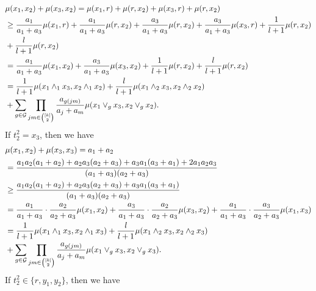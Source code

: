 \documentclass[11pt]{article}
\theoremstyle{definition}
\begin{document}
\begin{align}
    &\mu(x_1,x_2)+\mu(x_3,x_2)=\mu(x_1,r)+\mu(r,x_2)+\mu(x_3,r)+\mu(r,x_2)\notag\\
    &\geq \frac{a_1}{a_1+a_3}\mu(x_1,r)+\frac{a_1}{a_1+a_3}\mu(r,x_2)+\frac{a_3}{a_1+a_3}\mu(r,x_2)+\frac{a_3}{a_1+a_3}\mu(x_3,r)+\frac{1}{l+1}\mu(r,x_2)\notag\\
    &+\frac{l}{l+1}\mu(r,x_2)\notag\\
    &=\frac{a_1}{a_1+a_3}\mu(x_1,x_2)+\frac{a_3}{a_1+a_3}\mu(x_3,x_2)+\frac{1}{l+1}\mu(r,x_2)+\frac{l}{l+1}\mu(r,x_2)\notag\\
    &= \frac{1}{l+1}\mu(x_1\wedge_1 x_3,x_2\wedge_1 x_2)+\frac{l}{l+1}\mu(x_1\wedge_2 x_3,x_2\wedge_2 x_2)\notag\\
    &+\sum_{g\in \mathcal{G}}\prod_{\tiny jm\in
\begin{pmatrix}
[k] \\
2 \\
\end{pmatrix}\normalsize}\frac{a_{g(jm)}}{a_j+a_m}\mu(x_1\vee_g x_3,x_2\vee_g x_2).
\end{align}
If $t_2^2=x_3$, then we have
\begin{align}
    &\mu(x_1,x_2)+\mu(x_3,x_3)=a_1+a_2\notag\\
    &=\frac{a_1a_2(a_1+a_2)+a_2a_3(a_2+a_3)+a_3a_1(a_3+a_1)+2a_1a_2a_3}{(a_1+a_3)(a_2+a_3)}\notag\\
    &\geq \frac{a_1a_2(a_1+a_2)+a_2a_3(a_2+a_3)+a_3a_1(a_3+a_1)}{(a_1+a_3)(a_2+a_3)}\notag\\
    &=\frac{a_1}{a_1+a_3}\cdot \frac{a_2}{a_2+a_3} \mu(x_1,x_2)+\frac{a_3}{a_1+a_3}\cdot \frac{a_2}{a_2+a_3} \mu(x_3,x_2)+\frac{a_1}{a_1+a_3}\cdot \frac{a_3}{a_2+a_3} \mu(x_1,x_3)\notag\\
    &=\frac{1}{l+1}\mu(x_1\wedge_1 x_3,x_2\wedge_1 x_3)+\frac{l}{l+1}\mu(x_1\wedge_2 x_3,x_2\wedge_2 x_3)\notag\\
    &+\sum_{g\in \mathcal{G}}\prod_{\tiny jm\in
\begin{pmatrix}
[k] \\
2 \\
\end{pmatrix}\normalsize}\frac{a_{g(jm)}}{a_j+a_m}\mu(x_1\vee_g x_3,x_2\vee_g x_3).
\end{align}
If $t_2^2\in \{r,y_1,y_2\}$, then we have
\end{document}
